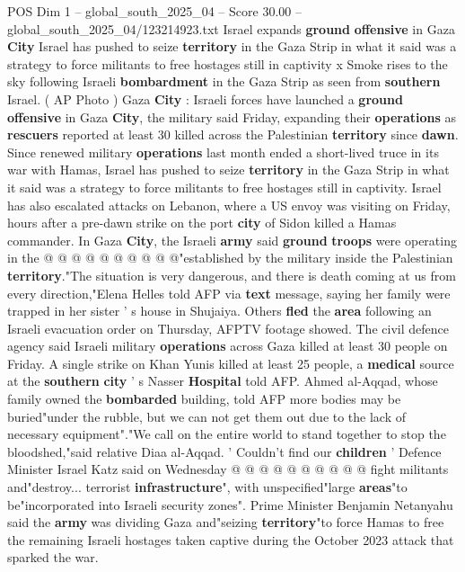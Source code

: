 \begin{textsample}{POS Dim 1 – global\_south\_2025\_04 – Score 30.00 – global\_south\_2025\_04/123214923.txt}  \label{ex:f1_pos_283}
Israel expands \textbf{ground} \textbf{offensive} in Gaza \textbf{City} Israel has pushed to seize \textbf{territory} in the Gaza Strip in what it said was a strategy to force militants to free hostages still in captivity x Smoke rises to the sky following Israeli \textbf{bombardment} in the Gaza Strip as seen from \textbf{southern} Israel. ( AP Photo ) Gaza \textbf{City} : Israeli forces have launched a \textbf{ground} \textbf{offensive} in Gaza \textbf{City}, the military said Friday, expanding their \textbf{operations} as \textbf{rescuers} reported at least 30 killed across the Palestinian \textbf{territory} since \textbf{dawn}.
Since renewed military \textbf{operations} last month ended a short-lived truce in its war with Hamas, Israel has pushed to seize \textbf{territory} in the Gaza Strip in what it said was a strategy to force militants to free hostages still in captivity.
Israel has also escalated attacks on Lebanon, where a US envoy was visiting on Friday, hours after a pre-dawn strike on the port \textbf{city} of Sidon killed a Hamas commander.
In Gaza \textbf{City}, the Israeli \textbf{army} said \textbf{ground} \textbf{troops} were operating in the @ @ @ @ @ @ @ @ @ @"established by the military inside the Palestinian \textbf{territory}."The situation is very dangerous, and there is death coming at us from every direction,"Elena Helles told AFP via \textbf{text} message, saying her family were trapped in her sister ' s house in Shujaiya.
Others \textbf{fled} the \textbf{area} following an Israeli evacuation order on Thursday, AFPTV footage showed.
The civil defence agency said Israeli military \textbf{operations} across Gaza killed at least 30 people on Friday.
A single strike on Khan Yunis killed at least 25 people, a \textbf{medical} source at the \textbf{southern} \textbf{city} ' s Nasser \textbf{Hospital} told AFP.
Ahmed al-Aqqad, whose family owned the \textbf{bombarded} building, told AFP more bodies may be buried"under the rubble, but we can not get them out due to the lack of necessary equipment"."We call on the entire world to stand together to stop the bloodshed,"said relative Diaa al-Aqqad. ' Couldn't find our \textbf{children} ' Defence Minister Israel Katz said on Wednesday @ @ @ @ @ @ @ @ @ @ fight militants and"destroy... terrorist \textbf{infrastructure}", with unspecified"large \textbf{areas}"to be"incorporated into Israeli security zones".
Prime Minister Benjamin Netanyahu said the \textbf{army} was dividing Gaza and"seizing \textbf{territory}"to force Hamas to free the remaining Israeli hostages taken captive during the October 2023 attack that sparked the war.

\end{textsample}
